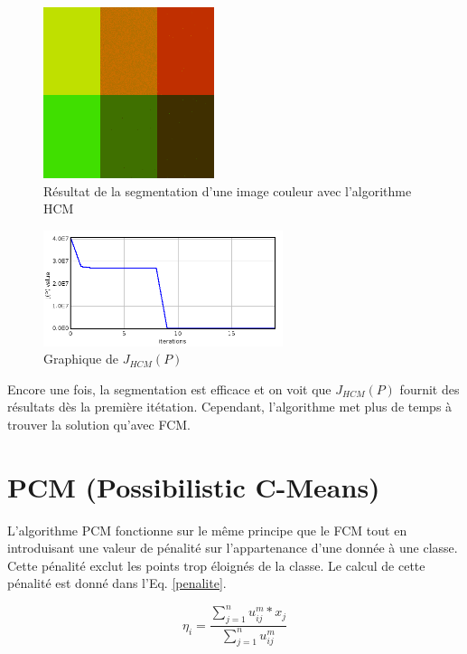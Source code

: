 \documentclass[a4paper,11pt]{article}
\begin{document}
\begin{figure}[!h]
  \begin{center}
    \includegraphics[width=5cm]{resultat/HCM.png}
    \caption{Résultat de la segmentation d'une image couleur avec l'algorithme HCM}
    \label{fig:hcm}
  \end{center}
\end{figure}

\begin{figure}[!h]
  \begin{center}
    \includegraphics[width=7cm]{resultat/HCM_graph.png}
    \caption{Graphique de $J_{HCM}(P)$}
    \label{fig:graphHCM}
  \end{center}
\end{figure}

Encore une fois, la segmentation est efficace et on voit que $J_{HCM}(P)$ fournit des résultats dès la première
itétation. Cependant, l'algorithme met plus de temps
à trouver la solution qu'avec FCM.
\newpage
\section{PCM (Possibilistic C-Means)}
L'algorithme PCM fonctionne sur le même principe que le FCM tout en introduisant une valeur de pénalité
sur l'appartenance d'une donnée à une classe. Cette pénalité exclut les points trop éloignés de la classe. 
Le calcul de cette pénalité est donné dans l'Eq. \ref{penalite}.

\begin{equation}
  \label{penalite}
  \eta_i = \frac{\sum_{j=1}^{n} u_{ij}^m * x_j}{\sum_{j=1}^{n} u_{ij}^m}
\end{equation}
\end{document}
